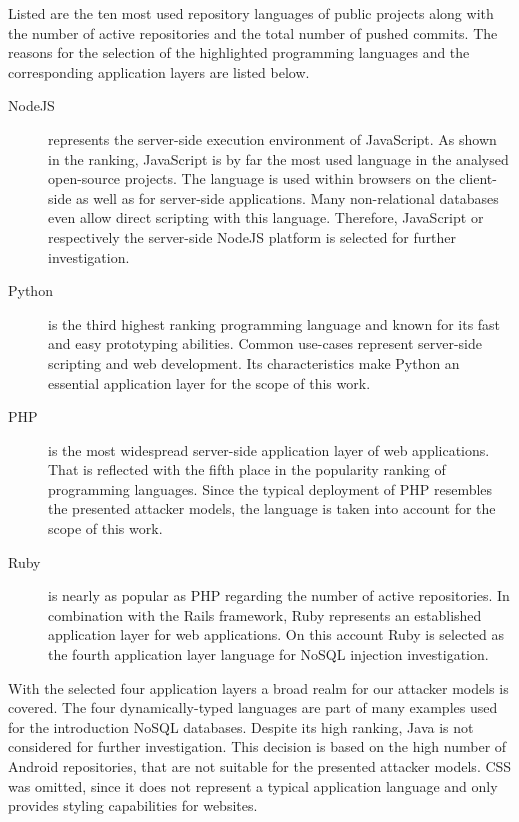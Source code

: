 Listed are the ten most used repository languages of public projects along with the number of active repositories and the total number of pushed commits. The reasons for the selection of the highlighted programming languages and the corresponding application layers are listed below.

\begin{description}
\item [NodeJS] represents the server-side execution environment of JavaScript. As shown in the ranking, JavaScript is by far the most used language in the analysed open-source projects. The language is used within browsers on the client-side as well as for server-side applications. Many non-relational databases even allow direct scripting with this language. Therefore, JavaScript or respectively the server-side NodeJS platform is selected for further investigation.
\item [Python] is the third highest ranking programming language and known for its fast and easy prototyping abilities. Common use-cases represent server-side scripting and web development. Its characteristics make Python an essential application layer for the scope of this work.
\item [PHP] is the most widespread server-side application layer of web applications. That is reflected with the fifth place in the popularity ranking of programming languages. Since the typical deployment of PHP resembles the presented attacker models, the language is taken into account for the scope of this work.
\item [Ruby] is nearly as popular as PHP regarding the number of active repositories. In combination with the Rails framework, Ruby represents an established application layer for web applications. On this account Ruby is selected as the fourth application layer language for NoSQL injection investigation.
\end{description}

With the selected four application layers a broad realm for our attacker models is covered. The four dynamically-typed languages are part of many examples used for the introduction NoSQL databases. Despite its high ranking, Java is not considered for further investigation. This decision is based on the high number of Android repositories, that are not suitable for the presented attacker models. CSS was omitted, since it does not represent a typical application language and only provides styling capabilities for websites.

